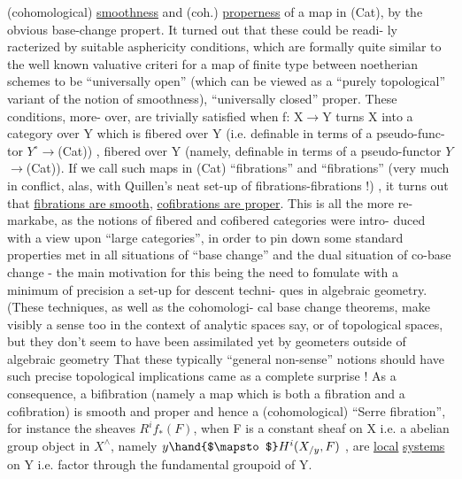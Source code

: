 
(cohomological) \uline{smoothness} and (coh.) \uline{properness} of a map in (Cat), by
the obvious base-change propert. It turned out that these could be readi-%
ly racterized by suitable asphericity conditions, which are formally
quite similar to the well known valuative criteri for a map of finite
type between noetherian schemes to be  ``universally open'' (which can
be viewed as a ``purely topological'' variant of the notion of smoothness),
 ``universally closed''   proper\deleted{)}. These conditions, more-%
over, are trivially satisfied when f: X$\longrightarrow$Y turns X into a category over Y
which is fibered over Y (i.e. definable in terms of a  pseudo-func-%
tor $Y^{\circ}\longrightarrow$(Cat)) ,   fibered over Y (namely, definable in terms of a
 pseudo-functor $Y$\deleted{$^{\circ}$}$\longrightarrow$(Cat)). If we call such maps in (Cat)
``fibrations'' and ``fibrations'' (very much in conflict, alas, with 
Quillen's neat set-up of fibrations-fibrations !) , it turns out that
\uline{fibrations are smooth}, \uline{cofibrations are proper}. This is all the more re-%
markabe, as the notions of fibered and cofibered categories were intro-%
duced with a view upon ``large categories'', in order to pin down some
standard properties met in all situations of ``base change'' \hand{(}and  \hand{(}the dual
situation of co-base change \hand{)} - the main motivation for this being the
need to fomulate with a minimum of precision a set-up for descent techni-%
ques in algebraic geometry. (These techniques, as well as the cohomologi-%
cal base change theorems, make visibly a sense too in the context of
analytic spaces say, or of topological spaces, but they don't seem to
have been assimilated yet by geometers outside of algebraic geometry\hand{)}
That these typically ``general non-sense'' notions should have such precise
topological implications came as a complete surprise ! As a consequence,
a bifibration (namely a map which is both a fibration and a cofibration)
is smooth and proper and hence a (cohomological) ``Serre fibration'', for
instance the sheaves $R^{i}f_{*}(F)$, when F is a constant  sheaf on X \hand{(}i.e. a
 abelian group object in $X^{\wedge}$\hand{)}, namely $y\hand{$\mapsto$}H^{i}(X_{/y},F)$ , are \uline{local} \uline{systems} 
on Y i.e. factor through the fundamental groupoid of Y. \unsure{*}

